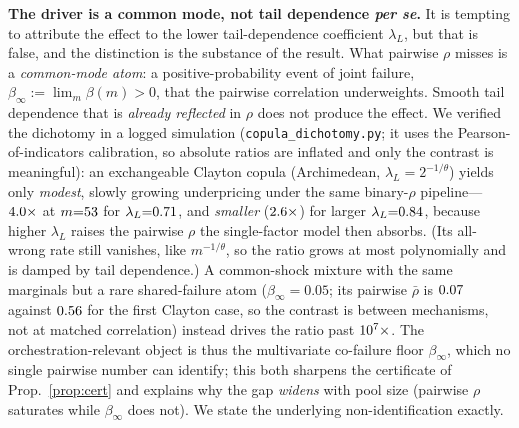\documentclass[11pt]{article}
\theoremstyle{plain}
\theoremstyle{definition}
\begin{document}
\noindent\textbf{The driver is a common mode, not tail dependence \emph{per se}.} It is tempting to attribute the effect to
the lower tail-dependence coefficient $\lambda_L$, but that is false, and the distinction is the substance of the result. What
pairwise $\rho$ misses is a \emph{common-mode atom}: a positive-probability event of joint failure, $\beta_\infty:=\lim_m\beta(m)>0$,
that the pairwise correlation underweights. Smooth tail dependence that is \emph{already reflected} in $\rho$ does not produce the
effect. We verified the dichotomy in a logged simulation (\texttt{copula\_dichotomy.py}; it uses the Pearson-of-indicators
calibration, so absolute ratios are inflated and only the contrast is meaningful): an exchangeable
Clayton copula (Archimedean, $\lambda_L=2^{-1/\theta}$) yields only \emph{modest}, slowly growing underpricing under the same
binary-$\rho$ pipeline---$4.0\times$ at $m{=}53$ for $\lambda_L{=}0.71$, and \emph{smaller} ($2.6\times$) for larger
$\lambda_L{=}0.84$, because higher $\lambda_L$ raises the pairwise $\rho$ the single-factor model then absorbs. (Its all-wrong
rate still vanishes, like $m^{-1/\theta}$, so the ratio grows at most polynomially and is damped by tail dependence.) A
common-shock mixture with the same marginals but a rare shared-failure atom ($\beta_\infty{=}0.05$; its pairwise
$\bar\rho$ is $0.07$ against $0.56$ for the first Clayton case, so the contrast is between mechanisms, not at matched
correlation) instead drives the ratio past
$10^{7}\times$. The
orchestration-relevant object is thus the multivariate co-failure floor $\beta_\infty$, which no single pairwise number can
identify; this both sharpens the certificate of Prop.~\ref{prop:cert} and explains why the gap \emph{widens} with pool size
(pairwise $\rho$ saturates while $\beta_\infty$ does not). We state the underlying non-identification exactly.
\end{document}
